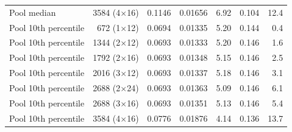 \begin{tabular}{@{}lrrrrrr@{}}
Pool median & 3584 (4$\times$16) & 0.1146 & 0.01656 & 6.92 & 0.104 & 12.4 \\
Pool 10th percentile & 672 (1$\times$12) & 0.0694 & 0.01335 & 5.20 & 0.144 & 0.4 \\
Pool 10th percentile & 1344 (2$\times$12) & 0.0693 & 0.01333 & 5.20 & 0.146 & 1.6 \\
Pool 10th percentile & 1792 (2$\times$16) & 0.0693 & 0.01348 & 5.15 & 0.146 & 2.5 \\
Pool 10th percentile & 2016 (3$\times$12) & 0.0693 & 0.01337 & 5.18 & 0.146 & 3.1 \\
Pool 10th percentile & 2688 (2$\times$24) & 0.0693 & 0.01363 & 5.09 & 0.146 & 6.1 \\
Pool 10th percentile & 2688 (3$\times$16) & 0.0693 & 0.01351 & 5.13 & 0.146 & 5.4 \\
Pool 10th percentile & 3584 (4$\times$16) & 0.0776 & 0.01876 & 4.14 & 0.136 & 13.7 \\
\bottomrule
\end{tabular}
